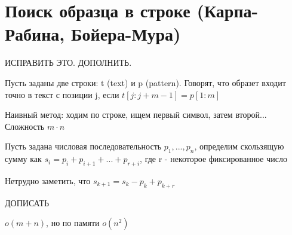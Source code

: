 \documentclass[discrete.tex]{subfiles}
\begin{document}
\section{Поиск образца в строке (Карпа-Рабина, Бойера-Мура)}
ИСПРАВИТЬ ЭТО. ДОПОЛНИТЬ.
\begin{definition}
  Пусть заданы две строки: t (text) и p (pattern). Говорят, что образет входит точно в текст с позиции j, если $t[j:j+m-1] = p[1:m]$
\end{definition}

Наивный метод: ходим по строке, ищем первый символ, затем второй... Сложность $m \cdot n$

\begin{definition}
  Пусть задана числовая последовательность $p_1,...,p_n$, определим скользящую сумму как $s_i=p_i+p_{i+1}+...+p_{r+i}$, где r - некоторое фиксированное число
\end{definition}

\begin{remark}
  Нетрудно заметить, что $s_{k+1} = s_k - p_k + p_{k+r}$
\end{remark}

ДОПИСАТЬ

\begin{alg}
  $o(m+n)$, но по памяти $o(n^2)$
\end{alg}
\end{document}
